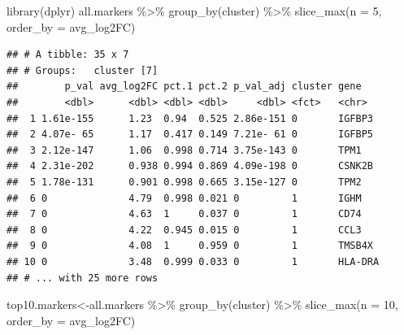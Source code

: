 \documentclass[
  openany]{book}
\newenvironment{Shaded}{\begin{snugshade}}{\end{snugshade}}
\newcommand{\AttributeTok}[1]{\textcolor[rgb]{0.77,0.63,0.00}{#1}}
\newcommand{\DecValTok}[1]{\textcolor[rgb]{0.00,0.00,0.81}{#1}}
\newcommand{\FunctionTok}[1]{\textcolor[rgb]{0.00,0.00,0.00}{#1}}
\newcommand{\NormalTok}[1]{#1}
\newcommand{\OtherTok}[1]{\textcolor[rgb]{0.56,0.35,0.01}{#1}}
\newcommand{\SpecialCharTok}[1]{\textcolor[rgb]{0.00,0.00,0.00}{#1}}
\begin{document}
\begin{Shaded}
\begin{Highlighting}[]
\FunctionTok{library}\NormalTok{(dplyr)}
\NormalTok{all.markers }\SpecialCharTok{\%\textgreater{}\%}
    \FunctionTok{group\_by}\NormalTok{(cluster) }\SpecialCharTok{\%\textgreater{}\%}
    \FunctionTok{slice\_max}\NormalTok{(}\AttributeTok{n =} \DecValTok{5}\NormalTok{, }\AttributeTok{order\_by =}\NormalTok{ avg\_log2FC)}
\end{Highlighting}
\end{Shaded}

\begin{verbatim}
## # A tibble: 35 x 7
## # Groups:   cluster [7]
##        p_val avg_log2FC pct.1 pct.2 p_val_adj cluster gene   
##        <dbl>      <dbl> <dbl> <dbl>     <dbl> <fct>   <chr>  
##  1 1.61e-155      1.23  0.94  0.525 2.86e-151 0       IGFBP3 
##  2 4.07e- 65      1.17  0.417 0.149 7.21e- 61 0       IGFBP5 
##  3 2.12e-147      1.06  0.998 0.714 3.75e-143 0       TPM1   
##  4 2.31e-202      0.938 0.994 0.869 4.09e-198 0       CSNK2B 
##  5 1.78e-131      0.901 0.998 0.665 3.15e-127 0       TPM2   
##  6 0              4.79  0.998 0.021 0         1       IGHM   
##  7 0              4.63  1     0.037 0         1       CD74   
##  8 0              4.22  0.945 0.015 0         1       CCL3   
##  9 0              4.08  1     0.959 0         1       TMSB4X 
## 10 0              3.48  0.999 0.033 0         1       HLA-DRA
## # ... with 25 more rows
\end{verbatim}

\begin{Shaded}
\begin{Highlighting}[]
\NormalTok{top10.markers}\OtherTok{\textless{}{-}}\NormalTok{all.markers }\SpecialCharTok{\%\textgreater{}\%}
    \FunctionTok{group\_by}\NormalTok{(cluster) }\SpecialCharTok{\%\textgreater{}\%}
    \FunctionTok{slice\_max}\NormalTok{(}\AttributeTok{n =} \DecValTok{10}\NormalTok{, }\AttributeTok{order\_by =}\NormalTok{ avg\_log2FC)}
\end{Highlighting}
\end{Shaded}

\begin{Shaded}
\end{Shaded}
\end{document}
